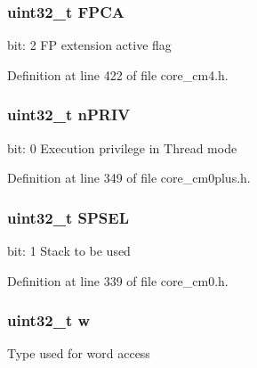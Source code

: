 \subsubsection[{\texorpdfstring{F\+P\+CA}{FPCA}}]{\setlength{\rightskip}{0pt plus 5cm}uint32\+\_\+t F\+P\+CA}\hypertarget{union_c_o_n_t_r_o_l___type_a2518558c090f60161ba4e718a54ee468}{}\label{union_c_o_n_t_r_o_l___type_a2518558c090f60161ba4e718a54ee468}
bit\+: 2 FP extension active flag 

Definition at line 422 of file core\+\_\+cm4.\+h.

\subsubsection[{\texorpdfstring{n\+P\+R\+IV}{nPRIV}}]{\setlength{\rightskip}{0pt plus 5cm}uint32\+\_\+t n\+P\+R\+IV}\hypertarget{union_c_o_n_t_r_o_l___type_a2a6e513e8a6bf4e58db169e312172332}{}\label{union_c_o_n_t_r_o_l___type_a2a6e513e8a6bf4e58db169e312172332}
bit\+: 0 Execution privilege in Thread mode 

Definition at line 349 of file core\+\_\+cm0plus.\+h.

\subsubsection[{\texorpdfstring{S\+P\+S\+EL}{SPSEL}}]{\setlength{\rightskip}{0pt plus 5cm}uint32\+\_\+t S\+P\+S\+EL}\hypertarget{union_c_o_n_t_r_o_l___type_ae185aac93686ffc78e998a9daf41415b}{}\label{union_c_o_n_t_r_o_l___type_ae185aac93686ffc78e998a9daf41415b}
bit\+: 1 Stack to be used 

Definition at line 339 of file core\+\_\+cm0.\+h.

\subsubsection[{\texorpdfstring{w}{w}}]{\setlength{\rightskip}{0pt plus 5cm}uint32\+\_\+t w}\hypertarget{union_c_o_n_t_r_o_l___type_ad0fb62e7a08e70fc5e0a76b67809f84b}{}\label{union_c_o_n_t_r_o_l___type_ad0fb62e7a08e70fc5e0a76b67809f84b}
Type used for word access 

